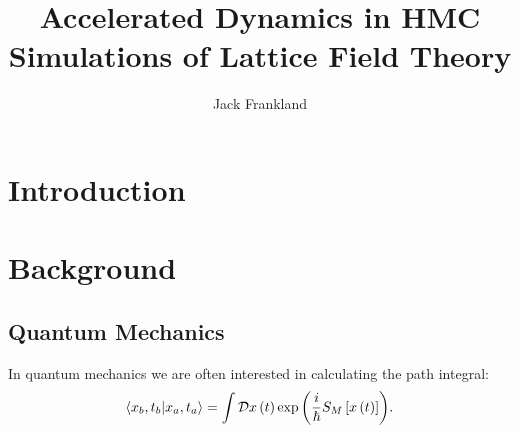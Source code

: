 \documentclass[12pt]{article}
\begin{document}
\title{Accelerated Dynamics in HMC Simulations of Lattice Field Theory} %
\author{Jack Frankland} %

\begin{abstract}
	
\end{abstract}

\maketitle

\personalstatement



\acknowledgments



\maintext


\section{Introduction}

\section{Background}

\subsection{Quantum Mechanics}

In quantum mechanics we are often interested in calculating the path integral:
\begin{equation}
	\label{eq:PathIntegral}
	\braket{x_b,t_b|x_a,t_a} = \int {\cal D} x\left(t\right) \exp{\left(\frac{i}{\hbar} S_M\left[x\left(t\right)\right]\right)}.
\end{equation}
\end{document}
